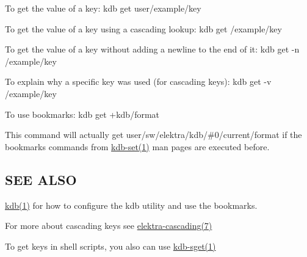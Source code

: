 To get the value of a key\+: {\ttfamily kdb get user/example/key}

To get the value of a key using a cascading lookup\+: {\ttfamily kdb get /example/key}

To get the value of a key without adding a newline to the end of it\+: {\ttfamily kdb get -\/n /example/key}

To explain why a specific key was used (for cascading keys)\+: {\ttfamily kdb get -\/v /example/key}

To use bookmarks\+: {\ttfamily kdb get +kdb/format}

This command will actually get {\ttfamily user/sw/elektra/kdb/\#0/current/format} if the bookmarks commands from \hyperlink{md_doc_help_kdb-set_doc_help_kdb-set_md}{kdb-\/set(1)} man pages are executed before.

\subsection*{S\+E\+E A\+L\+S\+O}


\begin{DoxyItemize}
\item \hyperlink{md_doc_help_kdb_doc_help_kdb_md}{kdb(1)} for how to configure the kdb utility and use the bookmarks.
\item For more about cascading keys see \hyperlink{md_doc_help_elektra-cascading_doc_help_elektra-cascading_md}{elektra-\/cascading(7)}
\item To get keys in shell scripts, you also can use \hyperlink{md_doc_help_kdb-sget_doc_help_kdb-sget_md}{kdb-\/sget(1)} 
\end{DoxyItemize}